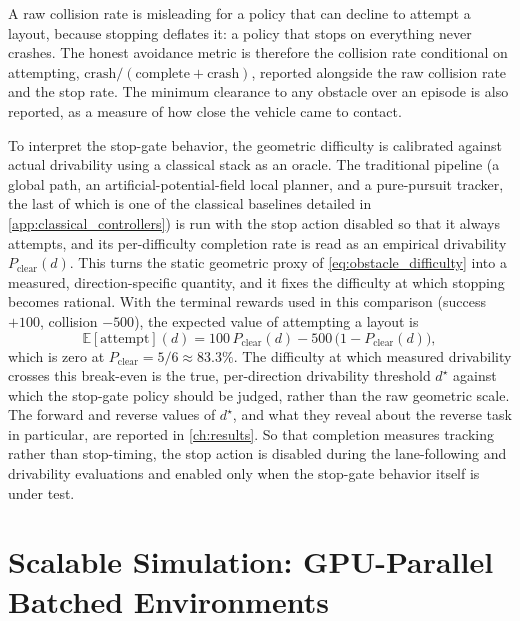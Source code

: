 A raw collision rate is misleading for a policy that can decline to attempt a layout, because stopping deflates it: a policy that stops on everything never crashes. The honest avoidance metric is therefore the collision rate conditional on attempting, $\mathrm{crash}/(\mathrm{complete}+\mathrm{crash})$, reported alongside the raw collision rate and the stop rate. The minimum clearance to any obstacle over an episode is also reported, as a measure of how close the vehicle came to contact.

To interpret the stop-gate behavior, the geometric difficulty is calibrated against actual drivability using a classical stack as an oracle. The traditional pipeline (a global path, an artificial-potential-field local planner, and a pure-pursuit tracker, the last of which is one of the classical baselines detailed in \cref{app:classical_controllers}) is run with the stop action disabled so that it always attempts, and its per-difficulty completion rate is read as an empirical drivability $P_{\mathrm{clear}}(d)$. This turns the static geometric proxy of \cref{eq:obstacle_difficulty} into a measured, direction-specific quantity, and it fixes the difficulty at which stopping becomes rational. With the terminal rewards used in this comparison (success $+100$, collision $-500$), the expected value of attempting a layout is
\begin{equation}
\mathbb{E}[\mathrm{attempt}](d) = 100\,P_{\mathrm{clear}}(d) - 500\,\bigl(1 - P_{\mathrm{clear}}(d)\bigr),
\label{eq:attempt_ev}
\end{equation}
which is zero at $P_{\mathrm{clear}} = 5/6 \approx 83.3\%$. The difficulty at which measured drivability crosses this break-even is the true, per-direction drivability threshold $d^\star$ against which the stop-gate policy should be judged, rather than the raw geometric scale. The forward and reverse values of $d^\star$, and what they reveal about the reverse task in particular, are reported in \cref{ch:results}. So that completion measures tracking rather than stop-timing, the stop action is disabled during the lane-following and drivability evaluations and enabled only when the stop-gate behavior itself is under test.

\section{Scalable Simulation: GPU-Parallel Batched Environments}
\label{sec:batched_sim}

